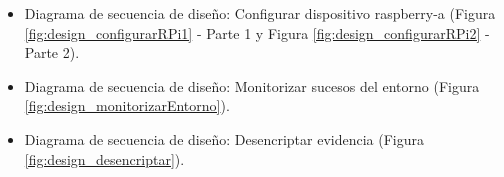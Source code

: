 \documentclass[12pt,a4paper, twoside]{report}
\begin{document}
	\begin{itemize}
		\item Diagrama de secuencia de diseño: Configurar dispositivo \gls{raspberry-a} (Figura \ref{fig:design_configurarRPi1} - Parte 1 y Figura \ref{fig:design_configurarRPi2} - Parte 2).
		
%		
		
		\newpage
		 
		\item Diagrama de secuencia de diseño: Monitorizar sucesos del entorno (Figura \ref{fig:design_monitorizarEntorno}).
		

		\newpage
		
		\item Diagrama de secuencia de diseño: Desencriptar evidencia (Figura \ref{fig:design_desencriptar}).

		

\end{itemize}
\end{document}
